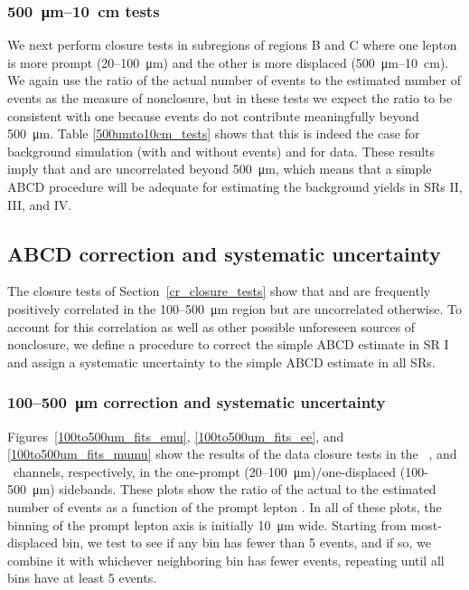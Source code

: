 \subsubsection{\SI{500}{\um}--\SI{10}{\cm} tests}
We next perform closure tests in subregions of regions B and C where one lepton is more prompt (\num{20}--\SI{100}{\um}) and the other is more displaced (\SI{500}{\um}--\SI{10}{\cm}). We again use the ratio of the actual number of events to the estimated number of events as the measure of nonclosure, but in these tests we expect the ratio to be consistent with one because \ztautaull events do not contribute meaningfully beyond \SI{500}{\um}. Table \ref{500umto10cm_tests} shows that this is indeed the case for background simulation (with and without \ztautaull events) and for data. These results imply that \ada and \adb are uncorrelated beyond \SI{500}{\um}, which means that a simple ABCD procedure will be adequate for estimating the background yields in SRs II, III, and IV.



\subsection{ABCD correction and systematic uncertainty}
\label{abcd_correction}
The closure tests of Section~\ref{cr_closure_tests} show that \ada and \adb are frequently positively correlated in the \num{100}--\SI{500}{\um} region but are uncorrelated otherwise. To account for this correlation as well as other possible unforeseen sources of nonclosure, we define a procedure to correct the simple ABCD estimate in SR I and assign a systematic uncertainty to the simple ABCD estimate in all SRs.

\subsubsection{\num{100}--\SI{500}{\um} correction and systematic uncertainty}
Figures~\ref{100to500um_fits_emu}, \ref{100to500um_fits_ee}, and \ref{100to500um_fits_mumu} show the results of the data closure tests in the \Pe\Pgm\, \Pe\Pe, and \Pgm\Pgm\ channels, respectively, in the one-prompt (\num{20}--\SI{100}{\um})/one-displaced (\num{100}-\SI{500}{\um}) sidebands. These plots show the ratio of the actual to the estimated number of events as a function of the prompt lepton \ad. In all of these plots, the binning of the prompt lepton axis is initially \SI{10}{\um} wide. Starting from most-displaced bin, we test to see if any bin has fewer than 5 events, and if so, we combine it with whichever neighboring bin has fewer events, repeating until all bins have at least 5 events.

